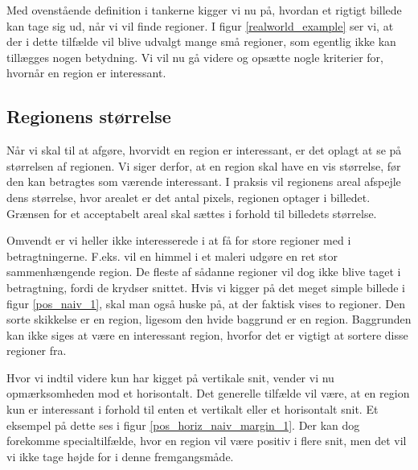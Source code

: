 {Med ovenstående definition i tankerne kigger vi nu på, hvordan et
rigtigt billede kan tage sig ud, når vi vil finde regioner. I figur
\ref{realworld_example} ser vi, at der i dette tilfælde vil blive
udvalgt mange små regioner, som egentlig ikke kan tillægges nogen
betydning.  Vi vil nu gå videre og opsætte nogle kriterier for, hvornår
en region er interessant.

\subsection{Regionens størrelse}
Når vi skal til at afgøre, hvorvidt en region er interessant, er det
oplagt at se på størrelsen af regionen.  Vi siger derfor, at en region
skal have en vis størrelse, før den kan betragtes som værende
interessant. I praksis vil regionens areal afspejle dens størrelse, hvor
arealet er det antal pixels, regionen optager i billedet.  Grænsen for et
acceptabelt areal skal sættes i forhold til billedets størrelse.

Omvendt er vi heller ikke interesserede i at få for store regioner med i
betragtningerne.  F.eks. vil en himmel i et maleri udgøre en ret stor
sammenhængende region.  De fleste af sådanne regioner vil dog ikke blive
taget i betragtning, fordi de krydser snittet.  Hvis vi kigger på det
meget simple billede i figur \ref{pos_naiv_1}, skal man også huske på, at
der faktisk vises to regioner. Den sorte skikkelse er en region, ligesom
den hvide baggrund er en region.  Baggrunden kan ikke siges at være en
interessant region, hvorfor det er vigtigt at sortere disse regioner
fra.

Hvor vi indtil videre kun har kigget på vertikale snit, vender vi nu
opmærksomheden mod et horisontalt.  Det generelle tilfælde vil være,
at en region kun er interessant i forhold til enten et vertikalt eller
et horisontalt snit.  Et eksempel på dette ses i figur
\ref{pos_horiz_naiv_margin_1}.  Der kan dog forekomme specialtilfælde,
hvor en region vil være positiv i flere snit, men det vil vi ikke tage
højde for i denne fremgangsmåde.

}
